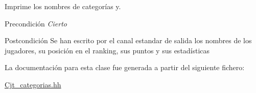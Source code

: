 Imprime los nombres de categorías y. 

\begin{DoxyPrecond}{Precondición}
{\itshape Cierto} 
\end{DoxyPrecond}
\begin{DoxyPostcond}{Postcondición}
Se han escrito por el canal estandar de salida los nombres de los jugadores, su posición en el ranking, sus puntos y sus estadísticas 
\end{DoxyPostcond}


La documentación para esta clase fue generada a partir del siguiente fichero\+:\begin{DoxyCompactItemize}
\item 
\hyperlink{_cjt__categorias_8hh}{Cjt\+\_\+categorias.\+hh}\end{DoxyCompactItemize}
